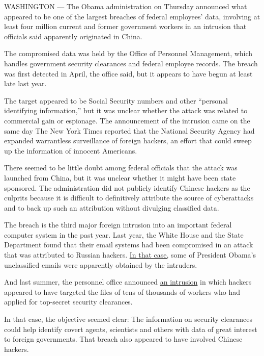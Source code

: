 WASHINGTON --- The Obama administration on Thursday announced what
appeared to be one of the largest breaches of federal employees' data,
involving at least four million current and former government workers in
an intrusion that officials said apparently originated in China.

The compromised data was held by the Office of Personnel Management,
which handles government security clearances and federal employee
records. The breach was first detected in April, the office said, but it
appears to have begun at least late last year.

The target appeared to be Social Security numbers and other ``personal
identifying information,'' but it was unclear whether the attack was
related to commercial gain or espionage. The announcement of the
intrusion came on the same day The New York Times reported that the
National Security Agency had expanded warrantless surveillance of
foreign hackers, an effort that could sweep up the information of
innocent Americans.

There seemed to be little doubt among federal officials that the attack
was launched from China, but it was unclear whether it might have been
state sponsored. The administration did not publicly identify Chinese
hackers as the culprits because it is difficult to definitively
attribute the source of cyberattacks and to back up such an attribution
without divulging classified data.

The breach is the third major foreign intrusion into an important
federal computer system in the past year. Last year, the White House and
the State Department found that their email systems had been compromised
in an attack that was attributed to Russian hackers.
\href{http://www.nytimes.com/2015/04/26/us/russian-hackers-read-obamas-unclassified-emails-officials-say.html?_r=0}{In
that case,} some of President Obama's unclassified emails were
apparently obtained by the intruders.

And last summer, the personnel office announced
\href{http://www.nytimes.com/2014/07/10/world/asia/chinese-hackers-pursue-key-data-on-us-workers.html}{an
intrusion} in which hackers appeared to have targeted the files of tens
of thousands of workers who had applied for top-secret security
clearances.

In that case, the objective seemed clear: The information on security
clearances could help identify covert agents, scientists and others with
data of great interest to foreign governments. That breach also appeared
to have involved Chinese hackers.


